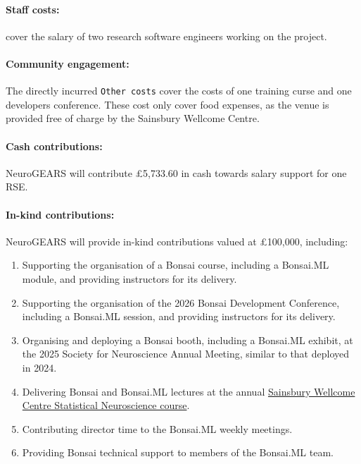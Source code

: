 \paragraph{Staff costs:} cover the salary of two research software engineers working on the project.

\paragraph{Community engagement:} The directly incurred \texttt{Other costs} cover the costs of one training curse and one developers conference. These cost only cover food expenses, as the venue is provided free of charge by the Sainsbury Wellcome Centre.

\paragraph{Cash contributions:}
NeuroGEARS will contribute £5,733.60 in cash towards salary support for one RSE.

\paragraph{In-kind contributions:}
NeuroGEARS will provide in-kind contributions valued at £100,000, including:

\begin{enumerate}
    \item Supporting the organisation of a Bonsai course, including a Bonsai.ML module, and providing instructors for its delivery.

    \item Supporting the organisation of the 2026 Bonsai Development Conference, including a Bonsai.ML session, and providing instructors for its delivery.

    \item Organising and deploying a Bonsai booth, including a Bonsai.ML exhibit, at the 2025 Society for Neuroscience Annual Meeting, similar to that deployed in 2024.

    \item Delivering Bonsai and Bonsai.ML lectures at the annual
    \href{https://github.com/joacorapela/statNeuro2025}{Sainsbury Wellcome Centre Statistical Neuroscience course}.

    \item Contributing director time to the Bonsai.ML weekly meetings.

    \item Providing Bonsai technical support to members of the Bonsai.ML team.
\end{enumerate}

